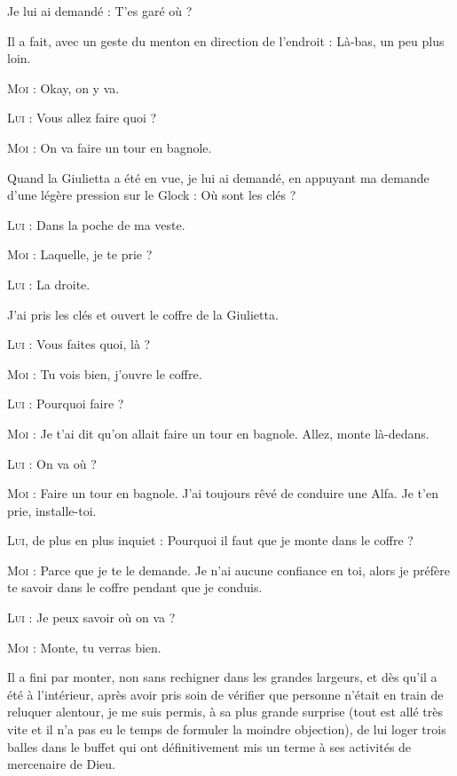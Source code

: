 \begin{dialogue}

Je lui ai demandé : T’es garé où ?

Il a fait, avec un geste du menton en direction de l’endroit : Là-bas, un peu plus loin.

\textsc{Moi} : Okay, on y va.

\textsc{Lui} : Vous allez faire quoi ?

\textsc{Moi} : On va faire un tour en bagnole.

Quand la Giulietta a été en vue, je lui ai demandé, en appuyant ma demande d’une légère pression sur le Glock : Où sont les clés ?

\textsc{Lui} : Dans la poche de ma veste.

\textsc{Moi} : Laquelle, je te prie ?

\textsc{Lui} : La droite.

\end{dialogue}

J’ai pris les clés et ouvert le coffre de la Giulietta.

\begin{dialogue}

\textsc{Lui} : Vous faites quoi, là ?

\textsc{Moi} : Tu vois bien, j’ouvre le coffre.

\textsc{Lui} : Pourquoi faire ?

\textsc{Moi} : Je t’ai dit qu’on allait faire un tour en bagnole. Allez, monte là-dedans.

\textsc{Lui} : On va où ?

\textsc{Moi} : Faire un tour en bagnole. J’ai toujours rêvé de conduire une Alfa. Je t’en prie, installe-toi.

\textsc{Lui}, de plus en plus inquiet : Pourquoi il faut que je monte dans le coffre ?

\textsc{Moi} : Parce que je te le demande. Je n’ai aucune confiance en toi, alors je préfère te savoir dans le coffre pendant que je conduis.

\textsc{Lui} : Je peux savoir où on va ?

\textsc{Moi} : Monte, tu verras bien.

\end{dialogue}

Il a fini par monter, non sans rechigner dans les grandes largeurs, et dès qu’il a été à l’intérieur, après avoir pris soin de vérifier que personne n’était en train de reluquer alentour, je me suis permis, à sa plus grande surprise (tout est allé très vite et il n’a pas eu le temps de formuler la moindre objection), de lui loger trois balles dans le buffet qui ont définitivement mis un terme à ses activités de mercenaire de Dieu.

